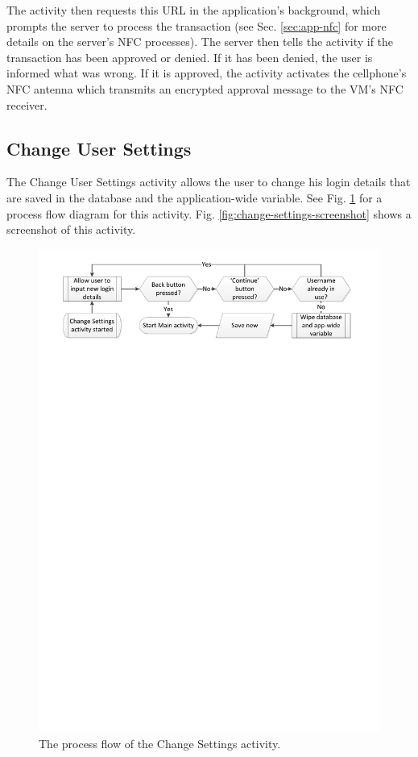 The activity then requests this URL in the application's background, which prompts the
server to process the transaction (see Sec. \ref{sec:app-nfc} for more details on the
server's NFC processes). The server then tells the activity if the transaction
has been approved or denied. If it has been denied, the user is informed what was wrong. 
If it is approved, the activity activates the cellphone's NFC antenna which transmits an
encrypted approval message to the VM's NFC receiver.

\subsection{Change User Settings}

The Change User Settings activity allows the user to change his login
details that are saved in the database and the application-wide variable. See Fig.
\ref{fig:change-user-settings} for a process flow diagram for this
activity. Fig. \ref{fig:change-settings-screenshot} shows a screenshot of this
activity.

\begin{figure}
 \centering 
 \includegraphics[clip = true, trim = 0 680 0 20,
 scale=0.7]{change_settings_processflow}
 \caption{The process flow of the Change Settings activity.}
 \label{fig:change-user-settings}
\end{figure}

